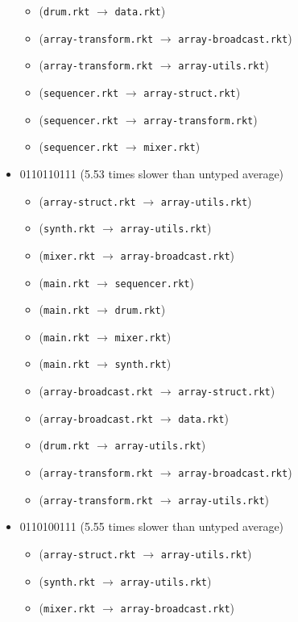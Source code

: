 \documentclass{article}
\newcommand{\mono}[1]{\texttt{#1}}
\begin{document}
\begin{itemize}
\begin{itemize}
  \item (\mono{drum.rkt} $\rightarrow$ \mono{data.rkt})
  \item (\mono{array-transform.rkt} $\rightarrow$ \mono{array-broadcast.rkt})
  \item (\mono{array-transform.rkt} $\rightarrow$ \mono{array-utils.rkt})
  \item (\mono{sequencer.rkt} $\rightarrow$ \mono{array-struct.rkt})
  \item (\mono{sequencer.rkt} $\rightarrow$ \mono{array-transform.rkt})
  \item (\mono{sequencer.rkt} $\rightarrow$ \mono{mixer.rkt})
  \end{itemize}
\item 0110110111 (5.53 times slower than untyped average)
  \begin{itemize}
  \item (\mono{array-struct.rkt} $\rightarrow$ \mono{array-utils.rkt})
  \item (\mono{synth.rkt} $\rightarrow$ \mono{array-utils.rkt})
  \item (\mono{mixer.rkt} $\rightarrow$ \mono{array-broadcast.rkt})
  \item (\mono{main.rkt} $\rightarrow$ \mono{sequencer.rkt})
  \item (\mono{main.rkt} $\rightarrow$ \mono{drum.rkt})
  \item (\mono{main.rkt} $\rightarrow$ \mono{mixer.rkt})
  \item (\mono{main.rkt} $\rightarrow$ \mono{synth.rkt})
  \item (\mono{array-broadcast.rkt} $\rightarrow$ \mono{array-struct.rkt})
  \item (\mono{array-broadcast.rkt} $\rightarrow$ \mono{data.rkt})
  \item (\mono{drum.rkt} $\rightarrow$ \mono{array-utils.rkt})
  \item (\mono{array-transform.rkt} $\rightarrow$ \mono{array-broadcast.rkt})
  \item (\mono{array-transform.rkt} $\rightarrow$ \mono{array-utils.rkt})
  \end{itemize}
\item 0110100111 (5.55 times slower than untyped average)
  \begin{itemize}
  \item (\mono{array-struct.rkt} $\rightarrow$ \mono{array-utils.rkt})
  \item (\mono{synth.rkt} $\rightarrow$ \mono{array-utils.rkt})
  \item (\mono{mixer.rkt} $\rightarrow$ \mono{array-broadcast.rkt})

\end{itemize}
\end{itemize}
\end{document}

